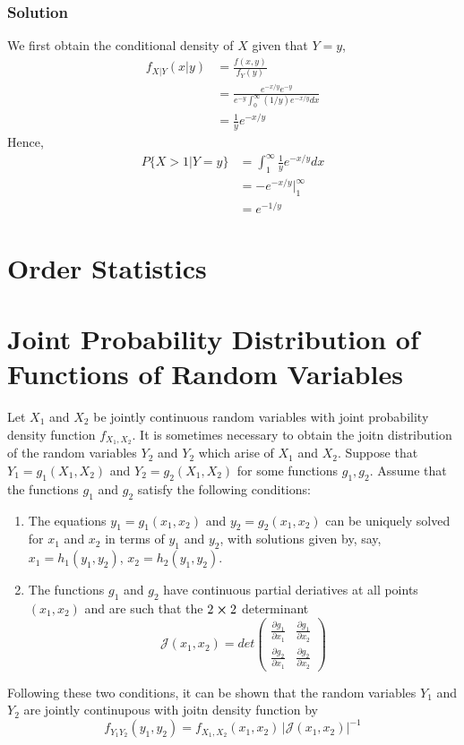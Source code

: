 \subsubsection*{Solution}
We first obtain the conditional density of $X$ given that $Y = y$,
\begin{equation*}
    \begin{split}
        f_{X|Y}(x\big | y) &= \frac{f(x,y)}{f_Y(y)}\\
        &= \frac{e^{-x/y}e^{-y}}{e^{-y}\int^\infty_0 (1/y)e^{-x/y} dx}\\
        &= \frac{1}{y}e^{-x/y}
    \end{split}
\end{equation*}
Hence, 
\begin{equation*}
    \begin{split}
        P\{X > 1|Y = y\} &= \int^\infty_1 \frac{1}{y}e^{-x/y} dx\\
        &= -e^{-x/y}|^\infty_1\\
        &= e^{-1/y}
    \end{split}
\end{equation*}
\section{Order Statistics}
\section{Joint Probability Distribution of Functions of Random Variables}
Let $X_1$ and $X_2$ be jointly continuous random variables with joint probability density function $f_{X_1,X_2}$. It is sometimes necessary to obtain the joitn distribution of the random variables $Y_2$ and $Y_2$ which arise of $X_1$ and $X_2$. Suppose that $Y_1 = g_1(X_1, X_2)$ and $Y_2 = g_2(X_1,X_2)$ for some functions $g_1, g_2$.
Assume that the functions $g_1$ and $g_2$ satisfy the following conditions:
\begin{enumerate}
    \item The equations $y_1 = g_1(x_1,x_2)$ and $y_2 = g_2(x_1,x_2)$ can be uniquely solved for $x_1$ and $x_2$ in terms of $y_1$ and $y_2$, with solutions given by, say, $x_1 = h_1(y_1,y_2)$, $x_2 = h_2(y_1,y_2)$.
    \item The functions $g_1$ and $g_2$ have continuous partial deriatives at all points $(x_1,x_2)$ and are such that the $2\cross 2$ determinant \[\mathcal{J} (x_1, x_2) = det\begin{pmatrix}\frac{\partial g_1}{\partial x_1} & \frac{\partial g_1}{\partial x_2}\\ \frac{\partial g_2}{\partial x_1} & \frac{\partial g_2}{\partial x_2}\end{pmatrix}\]
\end{enumerate}
Following these two conditions, it can be shown that the random variables $Y_1$ and $Y_2$ are jointly continupous with joitn density function by \[f_{Y_1Y_2}(y_1, y_2) = f_{X_1, X_2} (x_1, x_2)\, |\mathcal{J} (x_1,x_2)|^{-1}\]
